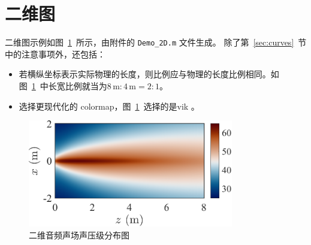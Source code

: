 \documentclass{article}
\begin{document}
\section{二维图}
二维图示例如图~\ref{fig:2d_fig}~所示，由附件的 \lstinline!Demo_2D.m! 文件生成。
除了第~\ref{sec:curves}~节中的注意事项外，还包括：
\begin{itemize}
    \item 若横纵坐标表示实际物理的长度，则比例应与物理的长度比例相同。如图~\ref{fig:2d_fig}~中长宽比例就当为$8\,\mathrm{m} : 4\, \mathrm{m} = 2:1$。
    \item 选择更现代化的 colormap，图~\ref{fig:2d_fig}~选择的是vik \cite{Crameri2020MisuseColourScience}。
\end{itemize}

\begin{figure}[!htb]
    \centering
    \includegraphics[width = 0.8\textwidth]{Demo_2D}
    \caption{二维音频声场声压级分布图}
    \label{fig:2d_fig}
\end{figure}





\end{document}
